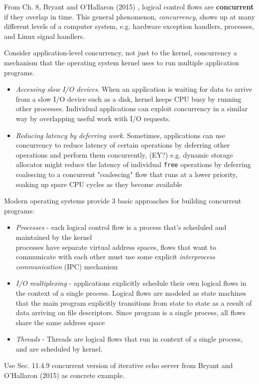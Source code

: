 \documentclass[10pt]{amsart}
\begin{document}
\begin{multicols*}{2}
From Ch. 8, Bryant and O'Hallaron (2015) \cite{BrOH2016}, logical control flows are \textbf{concurrent} if they overlap in time. This general phenomenon, \emph{concurrency}, shows up at many different levels of a computer system, e.g. hardware exception handlers, processes, and Linux signal handlers.

Consider application-level concurrency, not just to the kernel, concurrency a mechanism that the operating system kernel uses to run multiple application programs.

\begin{itemize}
	\item \emph{Accessing slow I/O devices}. When an application is waiting for data to arrive from a slow I/O device such as a disk, kernel keeps CPU busy by running other processes. Individual applications can exploit concurrency in a similar way by overlapping useful work with I/O requests.
	\item \emph{Reducing latency by deferring work}. Sometimes, applications can use concurrency to reduce latency of certain operations by deferring other operations and perform them concurrently, (EY?) e.g. dynamic storage allocator might reduce the latency of individual \verb|free| operations by deferring coalescing to a concurrent "coalescing" flow that runs at a lower priority, soaking up spare CPU cycles as they become available
\end{itemize}

Modern operating systems provide 3 basic approaches for building concurrent programs:
\begin{itemize}
	\item \emph{Processes} - each logical control flow is a process that's scheduled and maintained by the kernel \\
	processes have separate virtual address spaces, flows that want to communicate with each other must use some explicit \emph{interprocess communication} (IPC) mechanism
	\item \emph{I/O multiplexing} - applications explicitly schedule their own logical flows in the context of a single process. Logical flows are modeled as state machines that the main program explicitly transitions from state to state as a result of data arriving on file descriptors. Since program is a single process, all flows share the same address space
	\item \emph{Threads} - Threads are logical flows that run in context of a single process, and are scheduled by kernel.
\end{itemize}
Use Sec. 11.4.9 concurrent version of iterative echo server from Bryant and O'Hallaron (2015) \cite{BrOH2016} as concrete example.


\end{multicols*}
\end{document}
